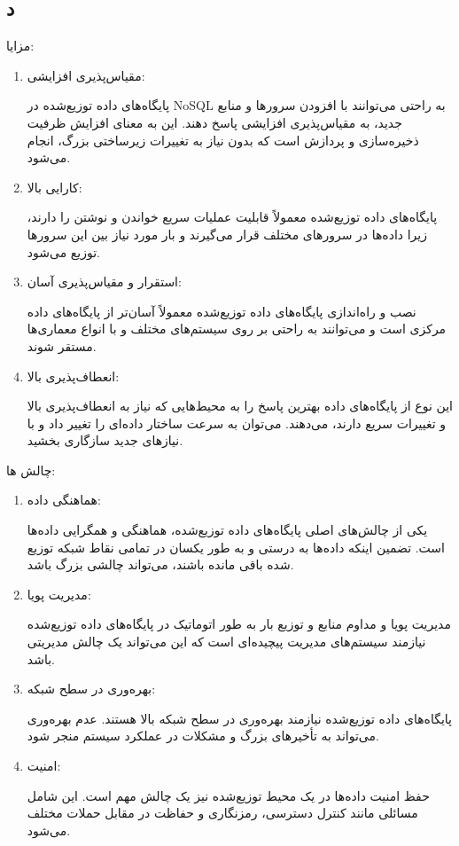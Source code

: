 \subsection*{د}
مزایا:
\begin{enumerate}

	\item  مقیاس‌پذیری افزایشی:

پایگاه‌های داده توزیع‌شده در NoSQL به راحتی می‌توانند با افزودن سرورها و منابع جدید، به مقیاس‌پذیری افزایشی پاسخ دهند. این به معنای افزایش ظرفیت ذخیره‌سازی و پردازش است که بدون نیاز به تغییرات زیرساختی بزرگ، انجام می‌شود.
	\item  کارایی بالا:

پایگاه‌های داده توزیع‌شده معمولاً قابلیت عملیات سریع خواندن و نوشتن را دارند، زیرا داده‌ها در سرورهای مختلف قرار می‌گیرند و بار مورد نیاز بین این سرورها توزیع می‌شود.
	\item  استقرار و مقیاس‌پذیری آسان:

نصب و راه‌اندازی پایگاه‌های داده توزیع‌شده معمولاً آسان‌تر از پایگاه‌های داده مرکزی است و می‌توانند به راحتی بر روی سیستم‌های مختلف و با انواع معماری‌ها مستقر شوند.
	\item  انعطاف‌پذیری بالا:

این نوع از پایگاه‌های داده بهترین پاسخ را به محیط‌هایی که نیاز به انعطاف‌پذیری بالا و تغییرات سریع دارند، می‌دهند. می‌توان به سرعت ساختار داده‌ای را تغییر داد و با نیازهای جدید سازگاری بخشید.
\end{enumerate}
\pagebreak
چالش ها:
\begin{enumerate}
\item  هماهنگی داده:
	
	یکی از چالش‌های اصلی پایگاه‌های داده توزیع‌شده، هماهنگی و همگرایی داده‌ها است. تضمین اینکه داده‌ها به درستی و به طور یکسان در تمامی نقاط شبکه توزیع شده باقی مانده باشند، می‌تواند چالشی بزرگ باشد.
\item  مدیریت پویا:
	
	مدیریت پویا و مداوم منابع و توزیع بار به طور اتوماتیک در پایگاه‌های داده توزیع‌شده نیازمند سیستم‌های مدیریت پیچیده‌ای است که این می‌تواند یک چالش مدیریتی باشد.
\item  بهره‌وری در سطح شبکه:
	
	پایگاه‌های داده توزیع‌شده نیازمند بهره‌وری در سطح شبکه بالا هستند. عدم بهره‌وری می‌تواند به تأخیرهای بزرگ و مشکلات در عملکرد سیستم منجر شود.
\item  امنیت:
	
	حفظ امنیت داده‌ها در یک محیط توزیع‌شده نیز یک چالش مهم است. این شامل مسائلی مانند کنترل دسترسی، رمزنگاری و حفاظت در مقابل حملات مختلف می‌شود.
\end{enumerate}

